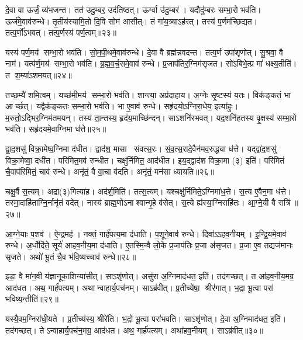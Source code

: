 दे॒वा वा ऊर्जं॒ व्य॑भजन्त। तत॑ उदु॒म्बर॒ उद॑तिष्ठत्। ऊर्ग्वा उ॑दु॒म्बर॑। यदौदु॑म्बरः सम्भा॒रो भव॑ति। ऊर्ज॑मे॒वाव॑रुन्धे। तृ॒तीय॑स्यामि॒तो दि॒वि सोम॑ आसीत्। तं गा॑य॒त्र्याऽह॑रत्। तस्य॑ प॒र्णम॑च्छिद्यत। तत्प॒र्णो॑ऽभवत्। तत्प॒र्णस्य॑ पर्ण॒त्वम्॥२३॥

यस्य॑ पर्ण॒मय॑ सम्भा॒रो भव॑ति। सो॒म॒पी॒थमे॒वाव॑रुन्धे। दे॒वा वै ब्रह्म॑न्नवदन्त। तत्प॒र्ण उपा॑शृणोत्। सु॒श्रवा॒ वै नाम॑। यत्प॑र्ण॒मय॑ सम्भा॒रो भव॑ति। ब्र॒ह्म॒व॒र्च॒समे॒वाव॑ रुन्धे। प्र॒जाप॑तिर॒ग्निम॑सृजत। सो॑ऽबिभे॒त्प्र मा॑ धक्ष्य॒तीति॑। त श॒म्या॑ऽशमयत्॥२४॥

तच्छ॒म्यै॑ शमि॒त्वम्। यच्छ॑मी॒मय॑ सम्भा॒रो भव॑ति। शान्त्या॒ अप्र॑दाहाय। अ॒ग्नेः सृ॒ष्टस्य॑ य॒तः। विक॑ङ्कतं॒ भा आर्च्छत्। यद्वैक॑ङ्कतः सम्भा॒रो भव॑ति। भा ए॒वाव॑ रुन्धे। सहृ॑दयो॒ऽग्निरा॒धेय॒ इत्या॑हुः। म॒रुतो॒ऽद्भिर॒ग्निम॑तमयन्। तस्य॑ ता॒न्तस्य॒ हृद॑य॒माच्छि॑न्दन्। साऽशनि॑रभवत्। यद॒शनि॑हतस्य वृ॒क्षस्य॑ सम्भा॒रो भव॑ति। सहृ॑दयमे॒वाग्निमा ध॑त्ते॥२५॥

द्वा॒द॒शसु॑ विक्रा॒मेष्व॒ग्निमा द॑धीत। द्वाद॑श॒ मासा संवत्स॒रः। सं॒व॒त्स॒रादे॒वैन॑मव॒रुद्ध्या ध॑त्ते। यद्द्वा॑द॒शसु॑ विक्रा॒मेष्वा॒ दधी॑त। परि॑मित॒मव॑ रुन्धीत। चक्षु॑र्निमित॒ आद॑धीत। इय॒द्द्वाद॑श विक्रा॒मा (३) इति॑। परि॑मितं चै॒वाप॑रिमितं॒ चाव॑ रुन्धे। अनृ॑तं॒ वै वा॒चा व॑दति। अनृ॑तं॒ मन॑सा ध्यायति॥२६॥

चक्षु॒र्वै स॒त्यम्। अद्रा(३)गित्या॑ह। अद॑र्\mbox{}श॒मिति॑। तत्स॒त्यम्। यश्चक्षु॑र्निमिते॒ऽग्निमा॑ध॒त्ते। स॒त्य ए॒वैन॒मा ध॑त्ते। तस्मा॒दाहि॑ताग्नि॒र्नानृ॑तं वदेत्। नास्य॑ ब्राह्म॒णोऽनाश्वान्गृ॒हे व॑सेत्। स॒त्ये ह्य॑स्या॒ग्निराहि॑तः। आ॒ग्ने॒यी वै रात्रि॑॥२७॥

आ॒ग्ने॒याः प॒शव॑। ऐ॒न्द्रमह॑। नक्तं॒ गार्\mbox{}ह॑पत्य॒मा द॑धाति। प॒शूने॒वाव॑ रुन्धे। दिवा॑ऽऽहव॒नीयम्। इ॒न्द्रि॒यमे॒वाव॑ रुन्धे। अ॒र्धोदि॑ते॒ सूर्य॑ आहव॒नीय॒मा द॑धाति। ए॒तस्मि॒न्वै लो॒के प्र॒जाप॑तिः प्र॒जा अ॑सृजत। प्र॒जा ए॒व तद्यज॑मानः सृजते। अथो॑ भू॒तं चै॒व भ॑वि॒ष्यच्चाव॑ रुन्धे॥२८॥

इडा॒ वै मा॑न॒वी य॑ज्ञानूका॒शिन्या॑सीत्। साऽशृ॑णोत्। असु॑रा अ॒ग्निमाद॑धत॒ इति॑। तद॑गच्छत्। त आ॑हव॒नीय॒मग्र॒ आद॑धत। अथ॒ गार्\mbox{}ह॑पत्यम्। अथान्वाहार्य॒पच॑नम्। साऽब्र॑वीत्। प्र॒तीच्ये॑षा॒ श्रीर॑गात्। भ॒द्रा भू॒त्वा परा॑ भविष्य॒न्तीति॑॥२९॥

यस्यै॒वम॒ग्निरा॑धी॒यते। प्र॒तीच्य॑स्य॒ श्रीरे॑ति। भ॒द्रो भू॒त्वा परा॑भवति। साऽशृ॑णोत्। दे॒वा अ॒ग्निमाद॑धत॒ इति॑। तद॑गच्छत्। तेऽन्वाहार्य॒पच॑न॒मग्र॒ आद॑धत। अथ॒ गार्\mbox{}ह॑पत्यम्। अथा॑हव॒नीयम्। साऽब्र॑वीत्॥३०॥

